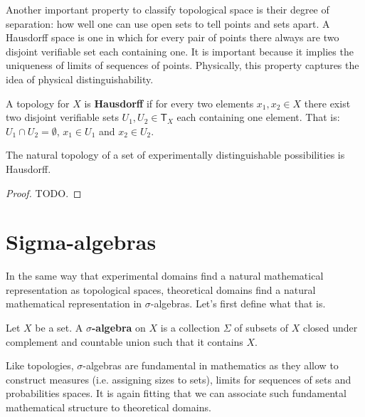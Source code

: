 \documentclass[11pt,letterpaper,fleqn]{memoir} %
\begin{document}
Another important property to classify topological space is their degree of separation: how well one can use open sets to tell points and sets apart. A Hausdorff space is one in which for every pair of points there always are two disjoint verifiable set each containing one. It is important because it implies the uniqueness of limits of sequences of points. Physically, this property captures the idea of physical distinguishability.

\begin{mathSection}
	\begin{defn}
		A topology for $X$ is \textbf{Hausdorff} if for every two elements $x_1, x_2 \in X$ there exist two disjoint verifiable sets $U_1, U_2 \in \mathsf{T}_X$ each containing one element. That is: $U_1 \cap U_2 = \emptyset$, $x_1 
		\in U_1$ and $x_2 \in U_2$.
	\end{defn}
	\begin{prop}
		The natural topology of a set of experimentally distinguishable possibilities is Hausdorff.
\end{prop}
\begin{proof}
	TODO.
\end{proof}
\end{mathSection}

\section{Sigma-algebras}

In the same way that experimental domains find a natural mathematical representation as topological spaces, theoretical domains find a natural mathematical representation in $\sigma$-algebras. Let's first define what that is.

\begin{mathSection}
	\begin{defn}
		Let $X$ be a set. A \textbf{$\sigma$-algebra} on $X$ is a collection $\Sigma$ of subsets of $X$ closed under complement and countable union such that it contains $X$.
	\end{defn}
\end{mathSection}

Like topologies, $\sigma$-algebras are fundamental in mathematics as they allow to construct measures (i.e. assigning sizes to sets), limits for sequences of sets and probabilities spaces. It is again fitting that we can associate such fundamental mathematical structure to theoretical domains.
\end{document}

